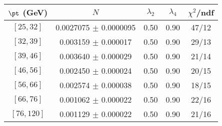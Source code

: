 \begin{tabular}{c||c|c|c|c}
$\pt$ (GeV) & $N$ & $\lambda_{2}$ & $\lambda_4$  & $\chi^2$/ndf  \\
\hline
$[25, 32]$ & 0.0027075 $\pm$ 0.0000095 & 0.50 & 0.90 & 47/12\\
$[32, 39]$ & 0.003159 $\pm$ 0.000017 & 0.50 & 0.90 & 29/13\\
$[39, 46]$ & 0.003640 $\pm$ 0.000029 & 0.50 & 0.90 & 21/14\\
$[46, 56]$ & 0.002450 $\pm$ 0.000024 & 0.50 & 0.90 & 20/15\\
$[56, 66]$ & 0.002574 $\pm$ 0.000038 & 0.50 & 0.90 & 18/15\\
$[66, 76]$ & 0.001062 $\pm$ 0.000022 & 0.50 & 0.90 & 22/16\\
$[76, 120]$ & 0.001129 $\pm$ 0.000022 & 0.50 & 0.90 & 21/16\\
\end{tabular}
